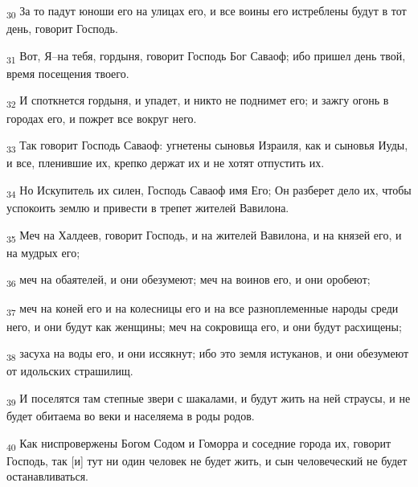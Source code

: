 \begin{tcolorbox}
\textsubscript{30} За то падут юноши его на улицах его, и все воины его истреблены будут в тот день, говорит Господь.
\end{tcolorbox}
\begin{tcolorbox}
\textsubscript{31} Вот, Я--на тебя, гордыня, говорит Господь Бог Саваоф; ибо пришел день твой, время посещения твоего.
\end{tcolorbox}
\begin{tcolorbox}
\textsubscript{32} И споткнется гордыня, и упадет, и никто не поднимет его; и зажгу огонь в городах его, и пожрет все вокруг него.
\end{tcolorbox}
\begin{tcolorbox}
\textsubscript{33} Так говорит Господь Саваоф: угнетены сыновья Израиля, как и сыновья Иуды, и все, пленившие их, крепко держат их и не хотят отпустить их.
\end{tcolorbox}
\begin{tcolorbox}
\textsubscript{34} Но Искупитель их силен, Господь Саваоф имя Его; Он разберет дело их, чтобы успокоить землю и привести в трепет жителей Вавилона.
\end{tcolorbox}
\begin{tcolorbox}
\textsubscript{35} Меч на Халдеев, говорит Господь, и на жителей Вавилона, и на князей его, и на мудрых его;
\end{tcolorbox}
\begin{tcolorbox}
\textsubscript{36} меч на обаятелей, и они обезумеют; меч на воинов его, и они оробеют;
\end{tcolorbox}
\begin{tcolorbox}
\textsubscript{37} меч на коней его и на колесницы его и на все разноплеменные народы среди него, и они будут как женщины; меч на сокровища его, и они будут расхищены;
\end{tcolorbox}
\begin{tcolorbox}
\textsubscript{38} засуха на воды его, и они иссякнут; ибо это земля истуканов, и они обезумеют от идольских страшилищ.
\end{tcolorbox}
\begin{tcolorbox}
\textsubscript{39} И поселятся там степные звери с шакалами, и будут жить на ней страусы, и не будет обитаема во веки и населяема в роды родов.
\end{tcolorbox}
\begin{tcolorbox}
\textsubscript{40} Как ниспровержены Богом Содом и Гоморра и соседние города их, говорит Господь, так [и] тут ни один человек не будет жить, и сын человеческий не будет останавливаться.
\end{tcolorbox}
